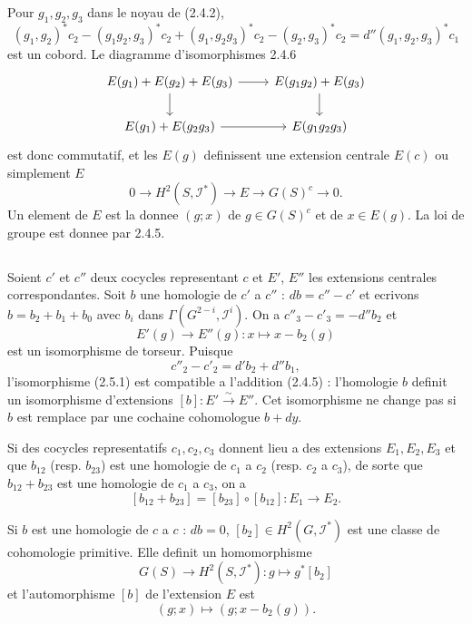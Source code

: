 \documentclass[11pt,a4paper]{article}
\theoremstyle{plain}
\theoremstyle{definition}
\begin{document}
Pour $g_1, g_2, g_3$ dans le noyau de (2.4.2),
\[
(g_1, g_2)^* c_2 - (g_1 g_2, g_3)^* c_2 + (g_1, g_2 g_3)^* c_2 - (g_2, g_3)^* c_2 = d''(g_1, g_2, g_3)^* c_1
\]
est un cobord. Le diagramme d'isomorphismes 2.4.6
\[
\begin{tikzcd}
E(g_1) + E(g_2) + E(g_3) \arrow{r} \arrow{d} & E(g_1 g_2) + E(g_3) \arrow{d} \\
E(g_1) + E(g_2 g_3) \arrow{r} & E(g_1 g_2 g_3)
\end{tikzcd}
\]
est donc commutatif, et les $E(g)$ definissent une extension centrale $E(c)$ ou simplement $E$
\begin{equation}\label{2.4.7}
0 \to H^2(S, \mathscr{I}^*) \to E \to G(S)^c \to 0.
\end{equation}
Un element de $E$ est la donnee $(g; x)$ de $g \in G(S)^c$ et de $x \in E(g)$. La loi de groupe est donnee par 2.4.5.

\subsection{}\label{2.5}

Soient $c'$ et $c''$ deux cocycles representant $c$ et $E'$, $E''$ les extensions centrales correspondantes. Soit $b$ une homologie de $c'$ a $c''$ : $d b = c'' - c'$ et ecrivons $b = b_2 + b_1 + b_0$ avec $b_i$ dans $\Gamma(G^{2-i}, \mathscr{I}^i)$. On a $c''_3 - c'_3 = -d'' b_2$ et
\begin{equation}\label{2.5.1}
E'(g) \to E''(g) : x \mapsto x - b_2(g)
\end{equation}
est un isomorphisme de torseur. Puisque
\[
c''_2 - c'_2 = d' b_2 + d'' b_1,
\]
l'isomorphisme (2.5.1) est compatible a l'addition (2.4.5) : l'homologie $b$ definit un isomorphisme d'extensions $[b] : E' \xrightarrow{\sim} E''$. Cet isomorphisme ne change pas si $b$ est remplace par une cochaine cohomologue $b + dy$.

Si des cocycles representatifs $c_1, c_2, c_3$ donnent lieu a des extensions $E_1, E_2, E_3$ et que $b_{12}$ (resp. $b_{23}$) est une homologie de $c_1$ a $c_2$ (resp. $c_2$ a $c_3$), de sorte que $b_{12} + b_{23}$ est une homologie de $c_1$ a $c_3$, on a
\begin{equation}\label{2.5.2}
[b_{12} + b_{23}] = [b_{23}] \circ [b_{12}] : E_1 \to E_2.
\end{equation}

Si $b$ est une homologie de $c$ a $c$ : $d b = 0$, $[b_2] \in H^2(G, \mathscr{I}^*)$ est une classe de cohomologie primitive. Elle definit un homomorphisme
\begin{equation}\label{2.5.3}
G(S) \to H^2(S, \mathscr{I}^*) : g \mapsto g^*[b_2]
\end{equation}
et l'automorphisme $[b]$ de l'extension $E$ est
\begin{equation}\label{2.5.4}
(g; x) \mapsto (g; x - b_2(g)).
\end{equation}
\end{document}
